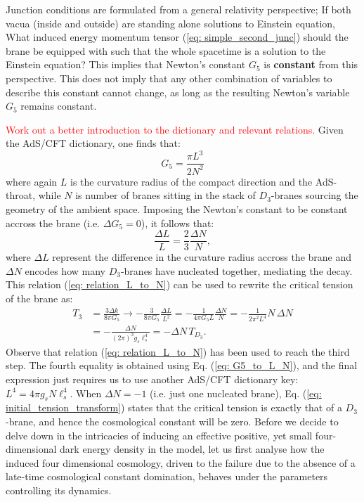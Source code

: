 Junction conditions are formulated from a general relativity perspective; If both vacua (inside and outside) are standing alone solutions to Einstein equation, What induced energy momentum tensor (\ref{eq: simple_second_junc}) should the brane be equipped with such that the whole spacetime is a solution to the Einstein equation? This implies that Newton's constant $G_{5}$ is \textbf{constant} from this perspective. This does not imply that any other combination of variables to describe this constant cannot change, as long as the resulting Newton's variable $G_{5}$ remains constant.

\textcolor{red}{Work out a better introduction to the dictionary and relevant relations.} Given the AdS/CFT dictionary, one finds that:
\begin{equation}\label{eq: G5_to_L_N}
    G_{5} = \frac{\pi L^{3}}{2 N^{2}}
\end{equation}
where again $L$ is the curvature radius of the compact direction and the AdS-throat, while $N$ is number of branes sitting in the stack of $D_{3}$-branes sourcing the geometry of the ambient space. Imposing the Newton's constant to be constant accross the brane (i.e. $\Delta G_5=0$), it follows that:
\begin{equation}\label{eq: relation_L_to_N}
    \frac{\Delta L}{L} = \frac{2}{3} \frac{\Delta N}{N} ,
\end{equation}
where $\Delta L$ represent the difference in the curvature radius accross the brane and $\Delta N$ encodes how many $D_{3}$-branes have nucleated together, mediating the decay. This relation (\ref{eq: relation_L_to_N}) can be used to rewrite the critical tension of the brane as:
\begin{equation}\label{eq: initial_tension_transform}
    \begin{split}
        T_3 &=\frac{3\Delta k}{8 \pi G_5} \rightarrow -\frac{3}{8 \pi G_5} \frac{\Delta L}{L^2} = -\frac{1}{4 \pi G_5 L}\frac{\Delta N}{N} =  -\frac{1}{2 \pi^{2} L^{4}} N \, \Delta N\\
        & = - \frac{\Delta N}{(2\pi)^{3} g_{s} \ell_{s}^{4}} = -\Delta N \, T_{D_{3}}.
    \end{split}
\end{equation}
Observe that relation (\ref{eq: relation_L_to_N}) has been used to reach the third step. The fourth equality is obtained using Eq. (\ref{eq: G5_to_L_N}), and the final expression just requires us to use another AdS/CFT dictionary key: $L^{4} = 4 \pi g_{s} N \ell_{s}^{4}$. When $\Delta N = -1$ (i.e. just one nucleated brane), Eq. (\ref{eq: initial_tension_transform}) states that the critical tension is exactly that of a $D_{3}$-brane, and hence the cosmological constant will be zero. Before we decide to delve down in the intricacies of inducing an effective positive, yet small four-dimensional dark energy density in the model, let us first analyse how the induced four dimensional cosmology, driven to the failure due to the absence of a late-time cosmological constant domination, behaves under the parameters controlling its dynamics.

